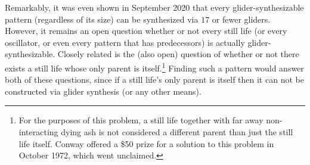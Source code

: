 Remarkably, it was even shown in September 2020 that every glider-synthesizable pattern (regardless of its size) can be synthesized via $17$ or fewer gliders. However, it remains an open question whether or not every still life (or every oscillator, or even every pattern that has predecessors) is actually glider-synthesizable. Closely related is the (also open) question of whether or not there exists a still life whose only parent is itself.\footnote{For the purposes of this problem, a still life together with far away non-interacting dying ash is not considered a different parent than just the still life itself. Conway offered a \$50 prize for a solution to this problem in October 1972, which went unclaimed.} Finding such a pattern would answer both of these questions, since if a still life's only parent is itself then it can not be constructed via glider synthesis (or any other means).


\clearpage %


